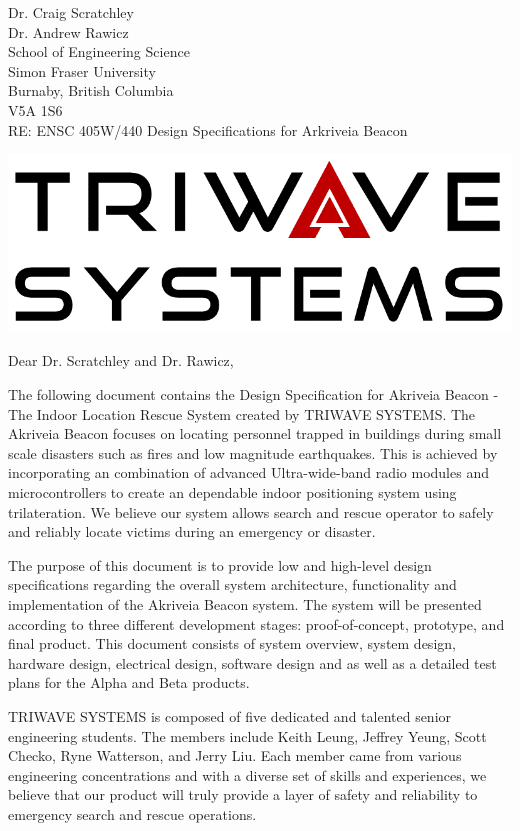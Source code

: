 \documentclass[11pt]{letter}
\date{July 7, 2019}
\begin{document}
\begin{letter}{
Dr. Craig Scratchley\\
Dr. Andrew Rawicz\\
School of Engineering Science\\
Simon Fraser University\\
Burnaby, British Columbia\\
V5A 1S6\\
\bigskip
RE: ENSC 405W/440 Design Specifications for Arkriveia Beacon\\
} 


\begin{center}
\includegraphics[scale=0.25]{./images/logo_W.png}
\end{center}

\opening{Dear Dr. Scratchley and Dr. Rawicz,} 

\medskip
The following document contains the Design Specification for Akriveia Beacon - The Indoor Location Rescue System created by TRIWAVE SYSTEMS. The Akriveia Beacon focuses on locating personnel trapped in buildings during small scale disasters such as fires and low magnitude earthquakes. This is achieved by incorporating an combination of advanced Ultra-wide-band radio modules and microcontrollers to create an dependable indoor positioning system using trilateration. We believe our system allows search and rescue operator to safely and reliably locate victims during an emergency or disaster.

\medskip
The purpose of this document is to provide low and high-level design specifications regarding the overall system architecture, functionality and implementation of the Akriveia Beacon system. The system will be presented according to three different development stages: proof-of-concept, prototype, and final product. This document consists of system overview, system design, hardware design, electrical design, software design and as well as a detailed test plans for the Alpha and Beta products.

\medskip
TRIWAVE SYSTEMS is composed of five dedicated and talented senior engineering students. The members include Keith Leung, Jeffrey Yeung, Scott Checko, Ryne Watterson, and Jerry Liu. Each member came from various engineering concentrations and with a diverse set of skills and experiences, we believe that our product will truly provide a layer of safety and reliability to emergency search and rescue operations.


\end{letter}
\end{document}
